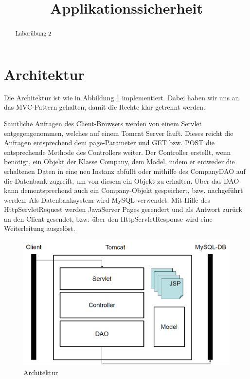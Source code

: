\documentclass[12pt]{scrartcl}
\title{ %
Applikationssicherheit 
\vspace{0.2cm}
}
\begin{document}
 \maketitle
 \thispagestyle{firststyle}
 \pagestyle{firststyle}
 \begin{abstract}
 \begin{center}
 Laborübung 2
 \end{center}
 \vspace{0.5cm}
\hrulefill
\end{abstract}

 \pagestyle{documentstyle}
 \tableofcontents
 \pagebreak
 
\section{Architektur}
Die Architektur ist wie in Abbildung \ref{fig:Arch} implementiert. Dabei haben wir uns an das MVC-Pattern gehalten, damit die Rechte klar getrennt werden.

Sämtliche Anfragen des Client-Browsers werden von einem Servlet entgegengenommen, welches auf einem Tomcat Server läuft. Dieses reicht die Anfragen entsprechend dem page-Parameter und GET bzw. POST die entsprechende Methode des Controllers weiter. Der Controller erstellt, wenn benötigt, ein Objekt der Klasse Company, dem Model, indem er entweder die erhaltenen Daten in eine neu Instanz abfüllt oder mithilfe des CompanyDAO auf die Datenbank zugreift, um von diesem ein Objekt zu erhalten. Über das DAO kann dementsprechend auch ein Company-Objekt gespeichert, bzw. nachgeführt werden. Als Datenbanksystem wird MySQL verwendet. Mit Hilfe des HttpServletRequest werden JavaServer Pages gerendert und als Antwort zurück an den Client gesendet, bzw. über den HttpServletResponse wird eine Weiterleitung ausgelöst.
\begin{figure}
	\centering
	\includegraphics[width=12cm]{./Architektur.png}
	\caption{Architektur}
	\label{fig:Arch}
\end{figure}
\end{document}
